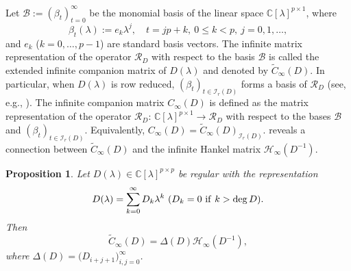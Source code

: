 \documentclass[12pt,reqno]{amsart}
\theoremstyle{plain}
\newtheorem{proposition}[theorem]{Proposition}
\numberwithin{equation}{section}
\theoremstyle{remark}
\def\wtilde{\widetilde} \def\what{\widehat}
\begin{document}
Let 
$
\mathscr B:=(\beta_t)_{t=0}^{\infty}
$ be the monomial basis of the linear space $\mathbb C[\lambda]^{p\times 1}$,
where 
$$
\beta_t(\lambda):=e_k \lambda^j,\quad t=jp+k,\ 0\leq k<p,\ j=0,1,\ldots, 
$$
and $e_k$ ($k=0,\ldots,p-1$) are standard basis vectors. 
The infinite matrix representation of the operator $\mathcal R_D$ with respect to the basis 
$\mathscr B$ is called the extended infinite companion matrix of $D(\lambda)$ and denoted by $\wtilde C_{\infty}(D)$. In particular, when $D(\lambda)$ is row reduced, $(\beta_t)_{t\in \mathcal I_r(D)}$ forms a basis of $\mathscr R_D$ (see, e.g., \cite[Lemma 7]{BPV}). 
The infinite companion matrix $C_{\infty}(D)$ is defined as the matrix representation of the operator $\mathcal R_D$: $\mathbb C[\lambda]^{p\times 1}\rightarrow \mathscr R_D$ with respect to the bases $\mathscr B$ and $(\beta_t)_{t\in \mathcal I_r(D)}$. Equivalently,  $C_{\infty}(D)=\wtilde C_{\infty}(D)_{\mathcal I_r(D)}$.  \cite[Theorem 8]{BPV1999} reveals a connection between $\wtilde C_{\infty}(D)$ and the infinite Hankel matrix $\mathscr{H}_{\infty}(D^{-1})$.

\begin{proposition}\label{ProCinftyD}
Let $D(\lambda)\in \mathbb C[\lambda]^{p\times p}$ be regular with the representation 
$$
D(\lambda)=\sum_{k=0}^{\infty} D_k \lambda^k\ (D_k=0\ {\rm if}\ k>\deg D).
$$
Then 
$$
\wtilde C_{\infty}(D)=\Delta(D)\mathscr{H}_{\infty}(D^{-1}),
$$
where $\Delta(D)=\big(D_{i+j+1}\big)_{i,j=0}^{\infty}$. 
\end{proposition}
\end{document}
